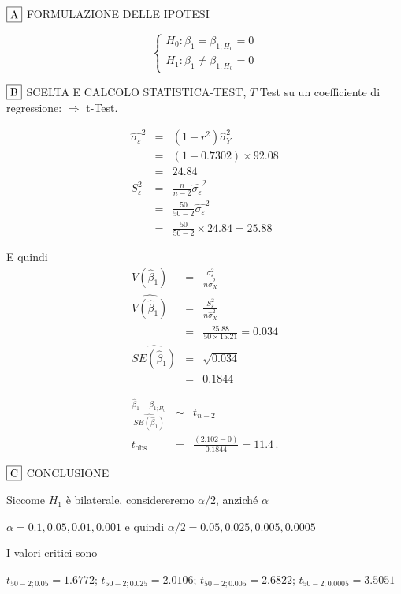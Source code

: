 \documentclass[
  11pt,
]{book}
\theoremstyle{mytheoremstyle}
\theoremstyle{mydefstyle}
\newenvironment{sol}
  {
  \begin{tcolorbox}[enhanced,breakable,arc=0.1mm,boxrule=1pt,colback=white,colframe=iblue,
  title=\bf \fontfamily{lmss}\selectfont \hspace{.5 cm} Soluzione,drop fuzzy shadow]

}{
\end{tcolorbox}
  }
\begin{document}
\begin{sol}
\(\fbox{A}\) FORMULAZIONE DELLE IPOTESI

\[\begin{cases}
   H_0: \beta_1 = \beta_{1;H_0}=0 \\
   H_1: \beta_1 \neq \beta_{1;H_0}=0 
   \end{cases}\]

\(\fbox{B}\) SCELTA E CALCOLO STATISTICA-TEST, \(T\)
Test su un coefficiente di regressione: \(\Rightarrow\) t-Test.

\begin{eqnarray*}
\hat{\sigma_\varepsilon}^2&=&(1-r^2)\hat\sigma_Y^2\\
&=& (1- 0.7302 )\times 92.08 \\
   &=&  24.84 \\
   S_\varepsilon^2 &=& \frac{n} {n-2} \hat{\sigma_\varepsilon}^2\\
   &=&  \frac{ 50 } { 50 -2} \hat{\sigma_\varepsilon}^2 \\
 &=&  \frac{ 50 } { 50 -2} \times  24.84  =  25.88  
\end{eqnarray*}

E quindi\begin{eqnarray*}
V(\hat\beta_{1}) &=& \frac{\sigma_{\varepsilon}^{2}} {n \hat{\sigma}^{2}_{X}} \\
\widehat{V(\hat\beta_{1})} &=& \frac{S_{\varepsilon}^{2}} {n \hat{\sigma}^{2}_{X}} \\
 &=& \frac{ 25.88 } { 50 \times  15.21 } =  0.034 \\
 \widehat{SE(\hat\beta_{1})}        &=&  \sqrt{ 0.034 }\\
 &=&  0.1844 
\end{eqnarray*}

\begin{eqnarray*}
 \frac{\hat\beta_{ 1 } - \beta_{ 1 ;H_0}} {\widehat{SE(\hat\beta_{ 1 })}}&\sim&t_{n-2}\\
   t_{\text{obs}}
&=& \frac{ ( 2.102 -  0 )} { 0.1844 }
 =   11.4 \, .
\end{eqnarray*}

\(\fbox{C}\) CONCLUSIONE

Siccome \(H_1\) è bilaterale, considereremo \(\alpha/2\),
anziché \(\alpha\)

\(\alpha=0.1, 0.05, 0.01, 0.001\) e quindi \(\alpha/2=0.05, 0.025, 0.005, 0.0005\)

I valori critici sono

\(t_{50-2;0.05}=1.6772\); \(t_{50-2;0.025}=2.0106\); \(t_{50-2;0.005}=2.6822\); \(t_{50-2;0.0005}=3.5051\)


\end{sol}
\end{document}
